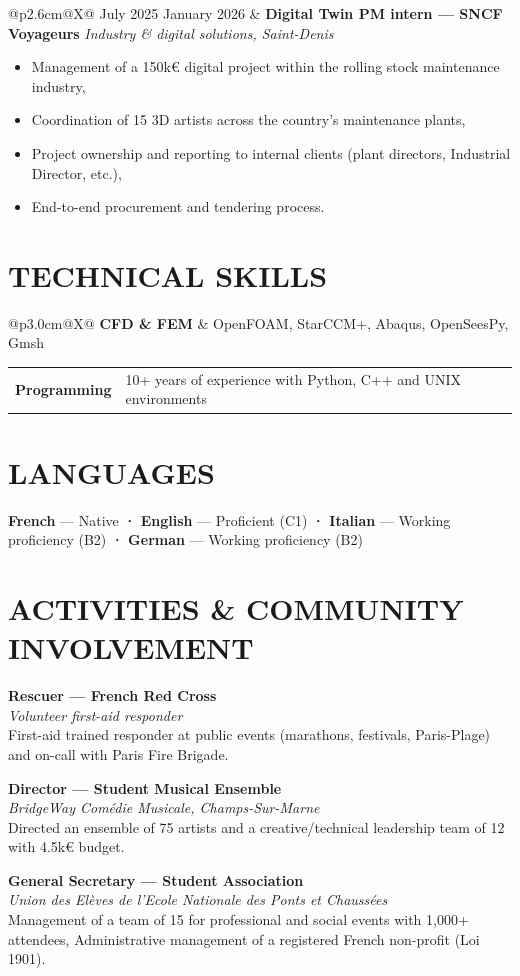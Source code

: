 \documentclass[a4paper,9pt]{extarticle}
\makeatletter
\newcommand{\entry}[4]{%
  \noindent
  \begin{tabularx}{\linewidth}{@{}p{2.6cm}@{\hspace{6pt}}X@{}}
    \small\textcolor{muted}{#1} &
    \textbf{#2} \newline
    \textit{\small\textcolor{muted}{#3}}
    #4
  \end{tabularx}
  \vspace{1pt}
}
\newcommand{\wideentry}[3]{%
  \noindent\textbf{#1}\\
  \textit{\small\textcolor{muted}{#2}}\\
  \small #3\par
  \vspace{1pt}
}
\newcommand{\skillrow}[2]{%
  \noindent
  \begin{tabularx}{\linewidth}{@{}p{3.0cm}@{\hspace{4pt}}X@{}}
    \small\textbf{\textcolor{accent}{#1}} & \small #2
  \end{tabularx}\par\vspace{1pt}
}
\makeatother
\begin{document}
\entry{July 2025 \newline January 2026}
  {Digital Twin PM intern — SNCF Voyageurs}
  {Industry \& digital solutions, Saint-Denis}
  {\begin{itemize}
    \item Management of a 150k€ digital project within the rolling stock maintenance industry,
    \item Coordination of 15 3D artists across the country's maintenance plants,
    \item Project ownership and reporting to internal clients (plant directors, Industrial Director, etc.),
    \item End-to-end procurement and tendering process.
  \end{itemize}}



\section{TECHNICAL SKILLS}

\skillrow{CFD \& FEM}{OpenFOAM, StarCCM+, Abaqus, OpenSeesPy, Gmsh}
\skillrow{Programming}{10+ years of experience with Python, C++ and UNIX environments}

\section{LANGUAGES}

\noindent\small
\textbf{French} — Native \quad\textbf{·}\quad
\textbf{English} — Proficient (C1) \quad\textbf{·}\quad
\textbf{Italian} — Working proficiency (B2) \quad\textbf{·}\quad
\textbf{German} — Working proficiency (B2)

\section{ACTIVITIES \& COMMUNITY INVOLVEMENT}

\wideentry
  {Rescuer — French Red Cross}
  {Volunteer first-aid responder}
  {First-aid trained responder at public events (marathons, festivals, Paris-Plage) and on-call with Paris Fire Brigade.}

\wideentry
  {Director — Student Musical Ensemble}
  {BridgeWay Comédie Musicale, Champs-Sur-Marne}
  {Directed an ensemble of 75 artists and a creative/technical leadership team of 12 with 4.5k€ budget.}

\wideentry
  {General Secretary — Student Association}
  {Union des Elèves de l'Ecole Nationale des Ponts et Chaussées}
  {Management of a team of 15 for professional and social events with 1,000+ attendees, Administrative management of a registered French non-profit (Loi 1901).}
\end{document}
